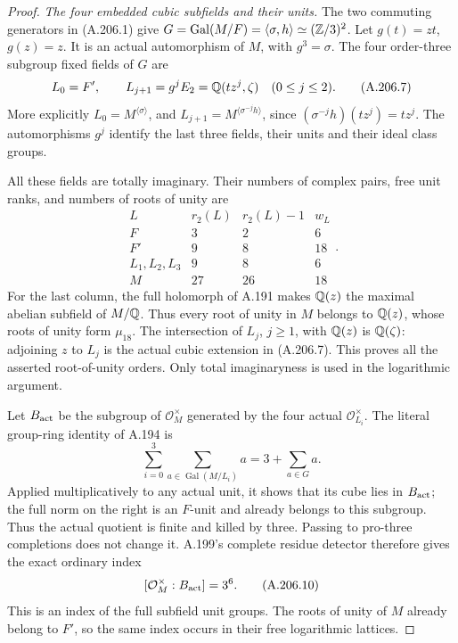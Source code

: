 \begin{proof}
\emph{The four embedded cubic subfields and their units.}
The two commuting generators in (A.206.1) give
\(G=\operatorname{Gal}(M/F)=\langle\sigma,h\rangle
\simeq(\mathbb Z/3)^2\).  Let \(g(t)=zt\), \(g(z)=z\).
It is an actual automorphism of \(M\), with
\(g^3=\sigma\).  The four order-three subgroup fixed
fields of \(G\) are
\[
 L_0=F',\qquad L_{j+1}=g^jE_2
       =\mathbb Q(tz^j,\zeta)\quad(0\leq j\leq2).
\tag{A.206.7}
\]
More explicitly \(L_0=M^{\langle\sigma\rangle}\),
and \(L_{j+1}=M^{\langle\sigma^{-j}h\rangle}\),
since \((\sigma^{-j}h)(tz^j)=tz^j\).
The automorphisms \(g^j\) identify the last three
fields, their units and their ideal class groups.

All these fields are totally imaginary.  Their numbers
of complex pairs, free unit ranks, and numbers of roots
of unity are
\[
\begin{array}{c|c|c|c}
 L&r_2(L)&r_2(L)-1&w_L\\\hline
 F&3&2&6\\
 F'&9&8&18\\
 L_1,L_2,L_3&9&8&6\\
 M&27&26&18
\end{array}.
\tag{A.206.8}
\]
For the last column, the full holomorph of A.191 makes
\(\mathbb Q(z)\) the maximal abelian subfield of \(M/\mathbb Q\).
Thus every root of unity in \(M\) belongs to
\(\mathbb Q(z)\), whose roots of unity form \(\mu_{18}\).
The intersection of \(L_j\), \(j\geq1\), with
\(\mathbb Q(z)\) is \(\mathbb Q(\zeta)\): adjoining \(z\)
to \(L_j\) is the actual cubic extension in (A.206.7).
This proves all the asserted root-of-unity orders.
Only total imaginaryness is used in the logarithmic argument.

Let \(B_{\rm act}\) be the subgroup of
\(\mathcal O_M^\times\) generated by the four actual
\(\mathcal O_{L_i}^\times\).  The literal group-ring
identity of A.194 is
\[
 \sum_{i=0}^3\sum_{a\in\operatorname{Gal}(M/L_i)}a
                 =3+\sum_{a\in G}a.
\tag{A.206.9}
\]
Applied multiplicatively to any actual unit, it shows
that its cube lies in \(B_{\rm act}\); the full norm
on the right is an \(F\)-unit and already belongs
to this subgroup.  Thus the actual quotient is finite
and killed by three.  Passing to pro-three completions
does not change it.  A.199's complete residue detector
therefore gives the exact ordinary index
\[
       [\mathcal O_M^\times:B_{\rm act}]=3^6.
\tag{A.206.10}
\]
This is an index of the full subfield unit groups.
The roots of unity of \(M\) already belong to \(F'\),
so the same index occurs in their free logarithmic lattices.


\end{proof}
